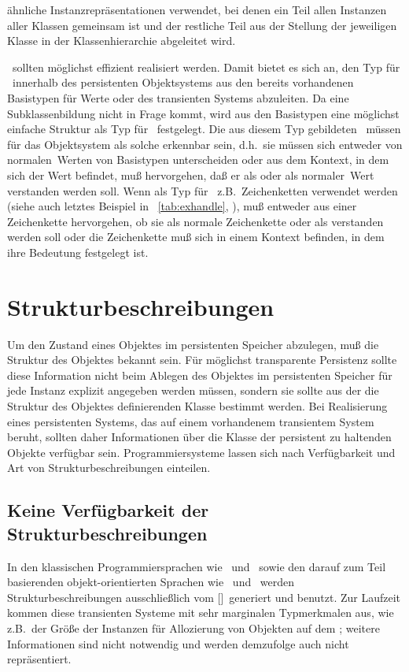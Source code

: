 \"{a}hn\-li\-che In\-stanz\-re\-pr\"{a}\-sen\-ta\-tio\-nen verwendet, bei
denen ein Teil allen Instanzen aller Klassen gemeinsam ist und der
restliche Teil aus der Stellung der jeweiligen Klasse in der
Klassenhierarchie abgeleitet wird.
%
\par\Objid[s]\ sollten m\"{o}glichst effizient realisiert werden. Damit
bietet es sich an, den Typ f\"{u}r \objid[s]\ innerhalb des persistenten
Objektsystems aus den bereits vorhandenen Basistypen f\"{u}r Werte oder
\immval[s]\/ des transienten Systems abzuleiten. Da eine
Subklassenbildung nicht in Frage kommt,
wird aus den Basistypen eine m\"{o}glichst einfache Struktur als Typ f\"{u}r
\objid[s]\ festgelegt.  Die aus diesem Typ gebildeten
\objid[s]\ m\"{u}ssen f\"{u}r das Objektsystem als solche erkennbar sein,
d.h.\ sie m\"{u}ssen sich entweder von \rglq{}normalen\rgrq\ Werten von
Basistypen unterscheiden oder aus dem Kontext, in dem sich der Wert
befindet, mu\ss{} hervorgehen, da\ss{} er als \objid\/ oder als
\rglq{}normaler\rgrq\ Wert verstanden werden soll.  Wenn als Typ f\"{u}r
\objid[s]\ z.B.\ Zeichenketten verwendet werden (siehe auch letztes
Beispiel in \tablename~\ref{tab:exhandle},
\citepage{\pageref{tab:exhandle}}), mu\ss{} entweder aus einer
Zeichenkette hervorgehen, ob sie als \rglq{}normale\rgrq{} Zeichenkette
oder als \objid\/ verstanden werden soll oder die Zeichenkette mu\ss{}
sich in einem Kontext befinden, in dem ihre Bedeutung festgelegt ist.
%
\section{Strukturbeschreibungen}
%
Um den Zustand eines Objektes im persistenten Speicher abzulegen, mu\ss{}
die Struktur des Objektes bekannt sein. F\"{u}r m\"{o}glichst transparente
Persistenz sollte diese Information nicht beim Ablegen des Objektes im
persistenten Speicher f\"{u}r jede Instanz explizit angegeben werden
m\"{u}ssen, sondern sie sollte aus der die Struktur des Objektes
definierenden Klasse bestimmt werden. Bei Realisierung eines
persistenten Systems, das auf einem vorhandenem transientem System
beruht, sollten daher Informationen \"{u}ber die Klasse der persistent zu
haltenden Objekte verf\"{u}gbar sein. Programmiersysteme lassen sich
nach Verf\"{u}gbarkeit und Art von Strukturbeschreibungen einteilen.
%
\subsection{Keine Verf\"{u}gbarkeit der Strukturbeschreibungen}%
%
In den klassischen Programmiersprachen wie \pascal\ und
\clogo\ sowie den darauf zum Teil basierenden objekt-orientierten
Sprachen wie \cpp\ und \eiffel\ werden Strukturbeschreibungen
ausschlie\ss{}lich vom []\ generiert und
benutzt. Zur Laufzeit kommen diese transienten Systeme mit sehr
marginalen Typmerkmalen aus, wie z.B.\ der Gr\"{o}\ss{}e der Instanzen f\"{u}r
Allozierung von Objekten auf dem \heap\/; weitere Informationen sind
nicht notwendig und werden demzufolge auch nicht repr\"{a}sentiert.
%
